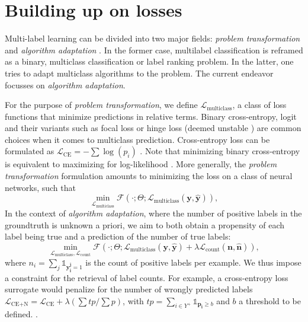 
\section{Building up on losses}
\label{sec:org8c910ea}

Multi-label learning can be divided into two major fields: \emph{problem transformation} and \emph{algorithm adaptation} \cite{multilabelReview}. In the former case, multilabel classification is reframed as a binary, multiclass classification or label ranking problem. In the latter, one tries to adapt multiclass algorithms to the problem. The current endeavor focusses on \emph{algorithm adaptation}.


For the purpose of \emph{problem transformation}, we define \(\mathcal{L}_{\text {multiclass}}\), a class of loss functions that minimize predictions in relative terms. Binary cross-entropy, logit and their variants such as focal loss or hinge loss (deemed unstable \cite{focalLoss}) are common choices when it comes to multiclass prediction. Cross-entropy loss can be formulated as \(\mathcal{L}_{\text {CE}}=-\sum \log \left(p_{i}\right)\) . Note that minimizing binary cross-entropy is equivalent to maximizing for log-likelihood \cite[Section 4.3.4]{Bishop}. More generally, the \emph{problem transformation} formulation amounts to minimizing the loss on a class of neural networks, such that
%
\begin{equation}
\underset{\mathcal{L}_{\text {multiclass}}} {\min} \mathcal{F}\left(\cdot ; \Theta; \mathcal{L}_{\text {multiclass}} (\mathbf{y}, \hat{\mathbf{y}}) \right),
\end{equation}
%
In the context of \emph{algorithm adaptation}, where the number of positive labels in the groundtruth is unknown a priori, we aim to both obtain a propensity of each label being true and a prediction of the number of true labels: 
%
\begin{equation}
\underset{\mathcal{L}_{\text {multiclass}}, \mathcal{L}_{\text {count}}} {\min} \mathcal{F}\left(\cdot ; \Theta; \mathcal{L}_{\text {multiclass}} (\mathbf{y}, \hat{\mathbf{y}}) + \lambda \mathcal{L}_{\text {count}} (\mathbf{n}, \hat{\mathbf{n}})\right),
\end{equation}
%
where \(n_i = \sum_j \mathds{1}_{\mathbf{y_i^j} = 1}\) is the count of positive labels per example. We thus impose a constraint for the retrieval of label counts. For example, a cross-entropy loss surrogate would penalize for the number of wrongly predicted labels \(\mathcal{L}_{\text {CE+N}}= \mathcal{L}_{\text {CE}} + \lambda (\sum tp / \sum p)\), with \(t p=\sum_{i \in Y^{+}} \mathds{1}_{\mathbf{p_i} \geq b}\) and \(b\) a threshold to be defined. .

